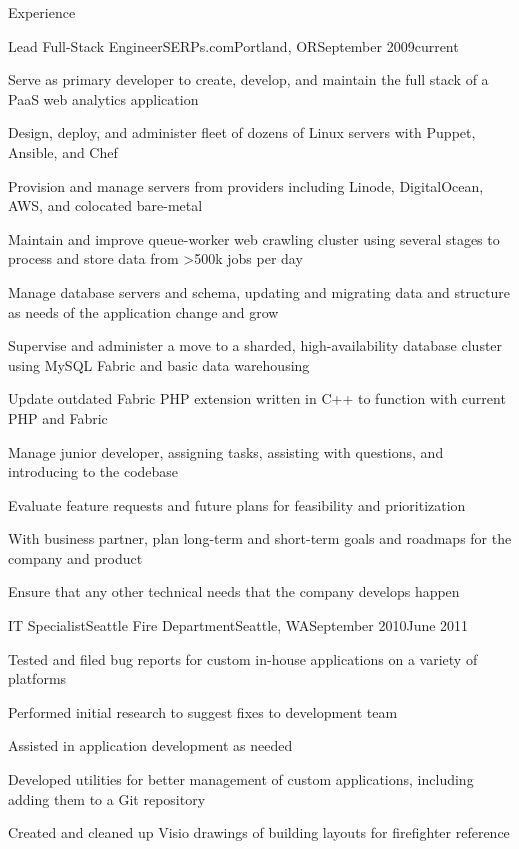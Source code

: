 \documentclass[letterpaper,10pt]{article}
\newcommand{\optarg}[2][]{%
  \ifthenelse{\isempty{#1}}%
    {}%
    {#2}%
}
\newenvironment{res_section}[1]{%
  \vskip 6pt
  \noindent
  {\Large \textbf{#1}}\\
  \rule[8pt]{\textwidth}{0.5pt}
  \vskip -8pt
}{
}
\newenvironment{res_subsection}[1]{%
  \vskip 4pt
  \noindent
  \textbf{\large{#1}}
  \begin{itemize}
}{
  \end{itemize}
}
\newenvironment{res_experienceitem}[5]{%
  \begin{res_subsection}{#1 - \em{%
  #2%
  \optarg[#3]{, #3}%
  \optarg[#4]{, #4}%
  \optarg[#5]{ -- #5}%
  }}
}{
  \end{res_subsection}
}
\begin{document}
\begin{res_section}{Experience}
\begin{res_experienceitem}{Lead Full-Stack Engineer}{SERPs.com}{Portland, OR}{September 2009}{current}
  \item Serve as primary developer to create, develop, and maintain the full stack of a PaaS web analytics application
  \item Design, deploy, and administer fleet of dozens of Linux servers with Puppet, Ansible, and Chef
  \item Provision and manage servers from providers including Linode, DigitalOcean, AWS, and colocated bare-metal
  \item Maintain and improve queue-worker web crawling cluster using several stages to process and store data from \textgreater500k jobs per day
  \item Manage database servers and schema, updating and migrating data and structure as needs of the application change and grow
  \item Supervise and administer a move to a sharded, high-availability database cluster using MySQL Fabric and basic data warehousing
  \item Update outdated Fabric PHP extension written in C++ to function with current PHP and Fabric
  \item Manage junior developer, assigning tasks, assisting with questions, and introducing to the codebase
  \item Evaluate feature requests and future plans for feasibility and prioritization
  \item With business partner, plan long-term and short-term goals and roadmaps for the company and product
  \item Ensure that any other technical needs that the company develops happen
\end{res_experienceitem}
\begin{res_experienceitem}{IT Specialist}{Seattle Fire Department}{Seattle, WA}{September 2010}{June 2011}
  \item Tested and filed bug reports for custom in-house applications on a variety of platforms
  \item Performed initial research to suggest fixes to development team
  \item Assisted in application development as needed
  \item Developed utilities for better management of custom applications, including adding them to a Git repository
  \item Created and cleaned up Visio drawings of building layouts for firefighter reference

\end{res_experienceitem}
\end{res_section}
\end{document}
